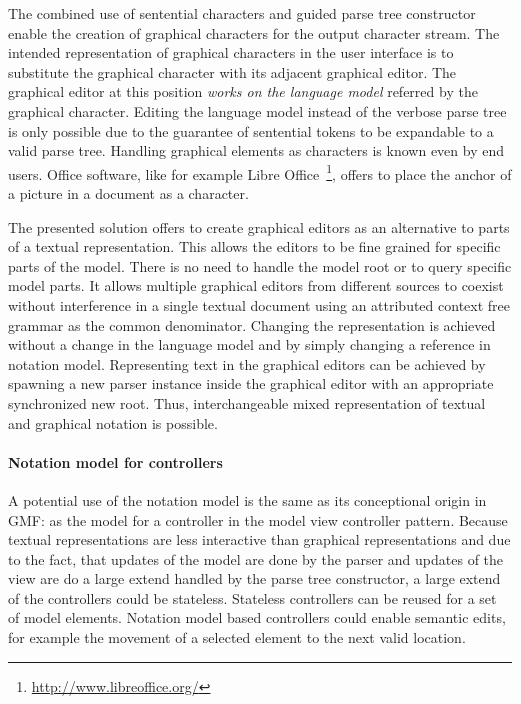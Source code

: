 The combined use of sentential characters and guided parse tree constructor enable the creation of graphical characters for the output character stream. The intended representation of graphical characters in the user interface is to substitute the graphical character with its adjacent graphical editor. The graphical editor at this position \emph{works on the language model} referred by the graphical character. Editing the language model instead of the verbose parse tree is only possible due to the guarantee of sentential tokens to be expandable to a valid parse tree. Handling graphical elements as characters is known even by end users. Office software, like for example Libre Office~\footnote{\raggedright \url{http://www.libreoffice.org/}}, offers to place the anchor of a picture in a document as a character.

The presented solution offers to create graphical editors as an alternative to parts of a textual representation. This allows the editors to be fine grained for specific parts of the model. There is no need to handle the model root or to query specific model parts. It allows multiple graphical editors from different sources to coexist without interference in a single textual document using an attributed context free grammar as the common denominator. Changing the representation is achieved without a change in the language model and by simply changing a reference in notation model. Representing text in the graphical editors can be achieved by spawning a new parser instance inside the graphical editor with an appropriate synchronized new root. Thus, interchangeable mixed representation of textual and graphical notation is possible.

\paragraph{Notation model for controllers} A potential use of the notation model is the same as its conceptional origin in GMF: as the model for a controller in the model view controller pattern. Because textual representations are less interactive than graphical representations and due to the fact, that updates of the model are done by the parser and updates of the view are do a large extend handled by the parse tree constructor, a large extend of the controllers could be stateless. Stateless controllers can be reused for a set of model elements. Notation model based controllers could enable semantic edits, for example the movement of a selected element to the next valid location. 




